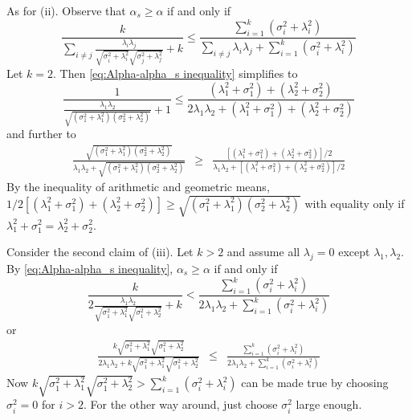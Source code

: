 \documentclass{article}
\makeatletter
\theoremstyle{plain}
\theoremstyle{plain}
\theoremstyle{definition}
\theoremstyle{remark}
\theoremstyle{definition}
\theoremstyle{plain}
\theoremstyle{plain}
\theoremstyle{definition}
\newenvironment{proof}[1][\protect\proofname]{\par
	\normalfont\topsep6\p@\@plus6\p@\relax
	\trivlist
	\itemindent\parindent
	\item[\hskip\labelsep\scshape #1]\ignorespaces
}{%
	\endtrivlist\@endpefalse
}
\providecommand{\proofname}{Proof}
\makeatother
\begin{document}
\begin{proof}[Proof of Proposition \ref{prop:Reliabilities.}]
As for (ii). Observe that $\alpha_{s}\geq\alpha$
if and only if
\begin{equation}
\label{eq:Alpha-alpha_s inequality}
\frac{k}{\sum_{i\neq j}\frac{\lambda_{i}\lambda_{j}}{\sqrt{\sigma_{i}^{2}+\lambda_{i}^{2}}\sqrt{\sigma_{j}^{2}+\lambda_{j}^{2}}}+k}\leq\frac{\sum_{i=1}^{k}\left(\sigma_{i}^{2}+\lambda_{i}^{2}\right)}{\sum_{i\neq j}\lambda_{i}\lambda_{j}+\sum_{i=1}^{k}\left(\sigma_{i}^{2}+\lambda_{i}^{2}\right)}
\end{equation}
Let $k=2$. Then \eqref{eq:Alpha-alpha_s inequality} simplifies to
\[
\frac{1}{\frac{\lambda_{1}\lambda_{2}}{\sqrt{\left(\sigma_{1}^{2}+\lambda_{1}^{2}\right)\left(\sigma_{2}^{2}+\lambda_{2}^{2}\right)}}+1}\leq\frac{\left(\lambda_{1}^{2}+\sigma_{1}^{2}\right)+\left(\lambda_{2}^{2}+\sigma_{2}^{2}\right)}{2\lambda_{1}\lambda_{2}+\left(\lambda_{1}^{2}+\sigma_{1}^{2}\right)+\left(\lambda_{2}^{2}+\sigma_{2}^{2}\right)}
\]
and further to
\begin{eqnarray*}
\frac{\sqrt{\left(\sigma_{1}^{2}+\lambda_{1}^{2}\right)\left(\sigma_{2}^{2}+\lambda_{2}^{2}\right)}}{\lambda_{1}\lambda_{2}+\sqrt{\left(\sigma_{1}^{2}+\lambda_{1}^{2}\right)\left(\sigma_{2}^{2}+\lambda_{2}^{2}\right)}} & \geq & \frac{\left[\left(\lambda_{1}^{2}+\sigma_{1}^{2}\right)+\left(\lambda_{2}^{2}+\sigma_{2}^{2}\right)\right]/2}{\lambda_{1}\lambda_{2}+\left[\left(\lambda_{1}^{2}+\sigma_{1}^{2}\right)+\left(\lambda_{2}^{2}+\sigma_{2}^{2}\right)\right]/2}
\end{eqnarray*}
By the inequality of arithmetic and geometric means, $1/2\left[\left(\lambda_{1}^{2}+\sigma_{1}^{2}\right)+\left(\lambda_{2}^{2}+\sigma_{2}^{2}\right)\right]\geq\sqrt{\left(\sigma_{1}^{2}+\lambda_{1}^{2}\right)\left(\sigma_{2}^{2}+\lambda_{2}^{2}\right)}$
with equality only if $\lambda_{1}^{2}+\sigma_{1}^{2}=\lambda_{2}^{2}+\sigma_{2}^{2}$.

Consider the second claim of (iii). Let $k>2$ and assume all $\lambda_{j}=0$
except $\lambda_{1},\lambda_{2}$. By \eqref{eq:Alpha-alpha_s inequality}, $\alpha_s \geq \alpha$ if and
only if
\[
\frac{k}{2\frac{\lambda_{1}\lambda_{2}}{\sqrt{\sigma_{1}^{2}+\lambda_{1}^{2}}\sqrt{\sigma_{1}^{2}+\lambda_{2}^{2}}}+k}<\frac{\sum_{i=1}^{k}\left(\sigma_{i}^{2}+\lambda_{i}^{2}\right)}{2\lambda_{1}\lambda_{2}+\sum_{i=1}^{k}\left(\sigma_{i}^{2}+\lambda_{i}^{2}\right)}
\]
or
\begin{eqnarray*}
\frac{k\sqrt{\sigma_{1}^{2}+\lambda_{1}^{2}}\sqrt{\sigma_{1}^{2}+\lambda_{2}^{2}}}{2\lambda_{1}\lambda_{2}+k\sqrt{\sigma_{1}^{2}+\lambda_{1}^{2}}\sqrt{\sigma_{1}^{2}+\lambda_{2}^{2}}} & \leq & \frac{\sum_{i=1}^{k}\left(\sigma_{i}^{2}+\lambda_{i}^{2}\right)}{2\lambda_{1}\lambda_{2}+\sum_{i=1}^{k}\left(\sigma_{i}^{2}+\lambda_{i}^{2}\right)}
\end{eqnarray*}
Now $k\sqrt{\sigma_{1}^{2}+\lambda_{1}^{2}}\sqrt{\sigma_{1}^{2}+\lambda_{2}^{2}}>\sum_{i=1}^{k}\left(\sigma_{i}^{2}+\lambda_{i}^{2}\right)$
can be made true by choosing $\sigma_{i}^{2}=0$ for $i>2$. For the
other way around, just choose $\sigma_{i}^{2}$ large enough.


\end{proof}
\end{document}
